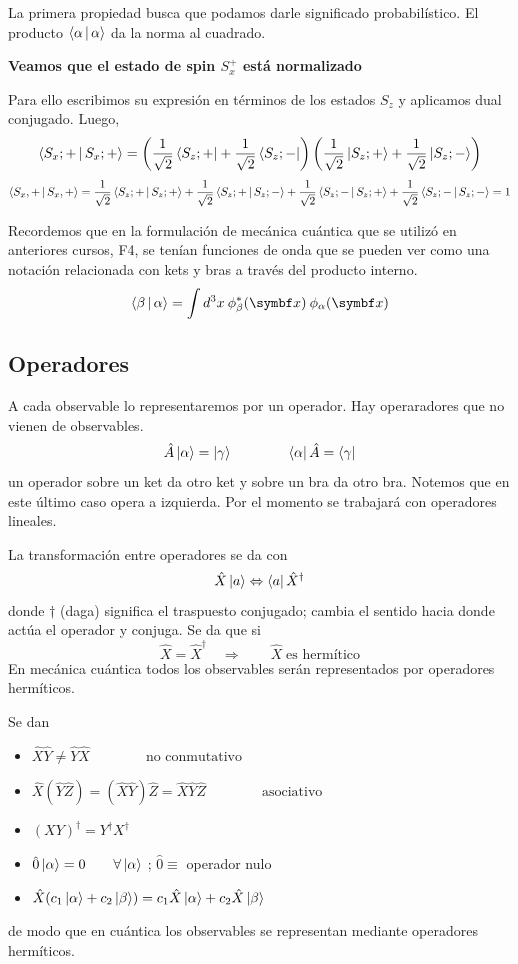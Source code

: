 \documentclass[10pt,oneside]{CBFT_book}
\begin{document}
La primera propiedad busca que podamos darle significado probabilístico.
El producto $\Braket{\alpha|\alpha}$ da la norma al cuadrado.

\begin{ejemplo}{\bf Veamos que el estado de spin $S_x^+$ está normalizado}

Para ello escribimos su expresión en términos de los estados $S_z$ y aplicamos dual conjugado.
Luego, 
\[
	\Braket{ S_x ; + | S_x ; + } =
	\left( \frac{1}{\sqrt{2}} \Bra{S_z;+} + \frac{1}{\sqrt{2}} \Bra{S_z;-} \right) 
	\left( \frac{1}{\sqrt{2}} \Ket{S_z;+} + \frac{1}{\sqrt{2}} \Ket{S_z;-} \right) 
\]
\[
	\Braket{S_x,+|S_x,+} =  \frac{1}{\sqrt{2}} \Braket{S_z;+|S_z;+} +
	\frac{1}{\sqrt{2}} \Braket{S_z;+|S_z;-} +
	\frac{1}{\sqrt{2}} \Braket{S_z;-|S_z;+} +
	\frac{1}{\sqrt{2}} \Braket{S_z;-|S_z;-} = 1
\]

\end{ejemplo}

Recordemos que en la formulación de mecánica cuántica que se utilizó en anteriores cursos, F4,
se tenían funciones de onda que se pueden ver como una notación relacionada con kets y bras
a través del producto interno.
\[
	\Braket{ \b | \a } = \int d^3x \: \phi^*_\b(\vbx) \: \phi_\a(\vbx) 
\]


\subsection{Operadores}

A cada observable lo representaremos por un operador. Hay operaradores que no vienen de observables.
\[
	\hat{A}\Ket{\alpha} = \Ket{\gamma} \qquad \qquad  \Bra{\alpha} \hat{A} = \Bra{\gamma}
\]
un operador sobre un ket da otro ket y sobre un bra da otro bra. Notemos que en este último caso opera 
a izquierda. Por el momento se trabajará con operadores lineales.

La transformación entre operadores se da con 
\[
	\hat{X}\Ket{a} \Leftrightarrow \Bra{a}\hat{X}^\dagger
\]
donde $\dagger$ (daga) significa el traspuesto conjugado; cambia el sentido hacia donde actúa el operador 
y conjuga. Se da que si 
\[
	\hat{X} = \hat{X}^\dagger \quad \Rightarrow \qquad \hat{X} \;\text{es hermítico}
\]
En mecánica cuántica todos los observables serán representados por operadores hermíticos.

Se dan 
\begin{itemize}
	\item $\hat{X}\hat{Y} \neq \hat{Y}\hat{X} \qquad \qquad \text{no conmutativo}$
	\item $\hat{X}(\hat{Y}\hat{Z}) = (\hat{X}\hat{Y})\hat{Z} = \hat{X}\hat{Y}\hat{Z} \qquad \qquad \text{asociativo}$
	\item $(XY)^\dagger = Y^\dagger X^\dagger$
	\item $\hat{0}\Ket{\alpha} = 0 \qquad \forall \Ket{\alpha}$ ; $\hat{0} \equiv$ operador nulo
	\item $\hat{X}( c_1 \Ket{\alpha} + c_2 \Ket{\beta} ) = c_1 \hat{X}\Ket{\alpha} + c_2 \hat{X}\Ket{\beta} $
\end{itemize}
de modo que en cuántica los observables se representan mediante operadores hermíticos.
\end{document}

